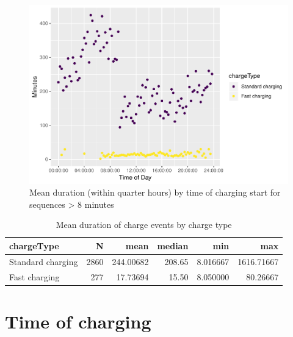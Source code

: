 \documentclass[]{article}
\begin{document}
\begin{figure}
\centering
\includegraphics{EVBB_SummaryReport_files/figure-latex/durationTimeMean-1.pdf}
\caption{\label{fig:durationTimeMean}Mean duration (within quarter hours) by
time of charging start for sequences \textgreater{} 8 minutes}
\end{figure}

\begin{table}[t]

\caption{\label{tab:meanDurationTable}Mean duration of charge events by charge type}
\centering
\begin{tabular}{l|r|r|r|r|r}
\hline
chargeType & N & mean & median & min & max\\
\hline
Standard charging & 2860 & 244.00682 & 208.65 & 8.016667 & 1616.71667\\
\hline
Fast charging & 277 & 17.73694 & 15.50 & 8.050000 & 80.26667\\
\hline
\end{tabular}
\end{table}

\section{Time of charging}\label{time-of-charging}
\end{document}
